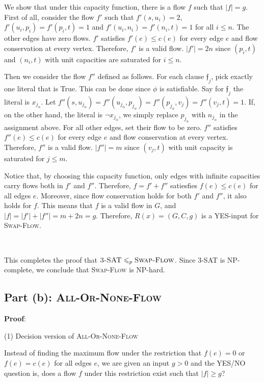 \documentclass{article}
\begin{document}
We show that under this capacity function, there is a flow $f$ such that $|f|=g$. First of all, consider the flow $f'$ such that $f'(s,u_i)=2$, $f'(u_i,p_i)=f'(p_i,t)=1$ and $f'(u_i,n_i)=f'(n_i,t)=1$ for all $i\leqslant n$. The other edges have zero flows. $f'$ satisfies $f'(e)\leqslant c(e)$ for every edge $e$ and flow conservation at every vertex. Therefore, $f'$ is a valid flow. $|f'|=2n$ since $(p_i,t)$ and $(n_i,t)$ with unit capacities are saturated for $i\leqslant n$.

Then we consider the flow $f''$ defined as follows. For each clause $\mathfrak{f}_j$, pick exactly one literal that is True. This can be done since $\phi$ is satisfiable. Say for $\mathfrak{f}_j$ the literal is $x_{j_\alpha}$. Let $f''(s,u_{j_\alpha})=f''(u_{j_\alpha},p_{j_\alpha})=f''(p_{j_\alpha},v_j)=f''(v_j,t)=1$. If, on the other hand, the literal is $\neg x_{j_\alpha}$, we simply replace $p_{j_\alpha}$ with $n_{j_\alpha}$ in the assignment above. For all other edges, set their flow to be zero. $f''$ satisfies $f''(e)\leqslant c(e)$ for every edge $e$ and flow conservation at every vertex. Therefore, $f''$ is a valid flow. $|f''|=m$ since $(v_j,t)$ with unit capacity is saturated for $j\leqslant m$.

Notice that, by choosing this capacity function, only edges with infinite capacities carry flows both in $f'$ and $f''$. Therefore, $f=f'+f''$ satiesfies $f(e)\leqslant c(e)$ for all edges $e$. Moreover, since flow conservation holds for both $f'$ and $f''$, it also holds for $f$. This means that $f$ is a valid flow in $G$, and $|f|=|f'|+|f''|=m+2n=g$. Therefore, $R(x)=(G,C,g)$ is a YES-input for \textsc{Swap-Flow}.

~

This completes the proof that $\textsc{3-SAT}\leqslant_p\textsc{Swap-Flow}$. Since \textsc{3-SAT} is NP-complete, we conclude that \textsc{Swap-Flow} is NP-hard.

\subsection{Part (b): \textsc{All-Or-None-Flow}}
\noindent\textbf{Proof}:

\noindent(1) Decision version of \textsc{All-Or-None-Flow}

Instead of finding the maximum flow under the restriction that $f(e)=0$ or $f(e)=c(e)$ for all edges $e$, we are given an input $g>0$ and the YES/NO question is, does a flow $f$ under this restriction exist such that $|f|\geqslant g$?
\end{document}
